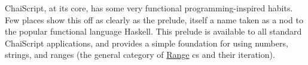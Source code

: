 Chai\+Script, at its core, has some very functional programming-\/inspired habits. Few places show this off as clearly as the prelude, itself a name taken as a nod to the popular functional language Haskell. This prelude is available to all standard Chai\+Script applications, and provides a simple foundation for using numbers, strings, and ranges (the general category of \mbox{\hyperlink{classChaiScript__Language_1_1Range}{Range}} cs and their iteration). 